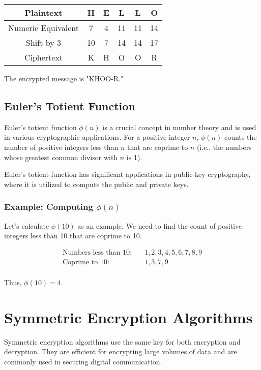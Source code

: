 \documentclass{article}
\begin{document}
\begin{center}
\begin{tabular}{|c|c|c|c|c|c|}
\hline
Plaintext & H & E & L & L & O \\
\hline
Numeric Equivalent & 7 & 4 & 11 & 11 & 14 \\
\hline
Shift by 3 & 10 & 7 & 14 & 14 & 17 \\
\hline
Ciphertext & K & H & O & O & R \\
\hline
\end{tabular}
\end{center}

The encrypted message is "KHOO-R."

\subsection{Euler's Totient Function}
Euler's totient function $\phi(n)$ is a crucial concept in number theory and is used in various cryptographic applications. For a positive integer $n$, $\phi(n)$ counts the number of positive integers less than $n$ that are coprime to $n$ (i.e., the numbers whose greatest common divisor with $n$ is 1).

Euler's totient function has significant applications in public-key cryptography, where it is utilized to compute the public and private keys.

\subsubsection{Example: Computing $\phi(n)$}
Let's calculate $\phi(10)$ as an example. We need to find the count of positive integers less than 10 that are coprime to 10.

\begin{align*}
\text{Numbers less than 10:} & \quad 1, 2, 3, 4, 5, 6, 7, 8, 9 \\
\text{Coprime to 10:} & \quad 1, 3, 7, 9 \\
\end{align*}

Thus, $\phi(10) = 4$.

\section{Symmetric Encryption Algorithms}
Symmetric encryption algorithms use the same key for both encryption and decryption. They are efficient for encrypting large volumes of data and are commonly used in securing digital communication.
\end{document}
